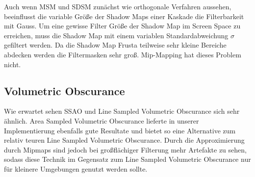 \documentclass[runningheaders,a4paper]{llncs}
\begin{document}
Auch wenn MSM und SDSM zunächst wie orthogonale Verfahren aussehen, beeinflusst die variable Größe der Shadow Maps einer Kaskade die Filterbarkeit mit Gauss.
Um eine gewisse Filter Größe der Shadow Map im Screen Space zu erreichen, muss die Shadow Map mit einem variablen Standardabweichung $\sigma$ gefiltert werden.
Da die Shadow Map Frusta teilweise sehr kleine Bereiche abdecken werden die Filtermasken sehr groß.
Mip-Mapping hat dieses Problem nicht.


\subsection{Volumetric Obscurance}
Wie erwartet sehen SSAO und Line Sampled Volumetric Obscurance sich sehr ähnlich. Area Sampled Volumetric
Obscurance lieferte in unserer Implementierung ebenfalls gute Resultate und bietet so eine Alternative 
zum relativ teuren Line Sampled Volumetric Obscurance. Durch die Approximierung durch Mipmaps sind jedoch bei
großflächiger Filterung mehr Artefakte zu sehen, sodass diese Technik im Gegensatz zum Line Sampled Volumetric
Obscurance nur für kleinere Umgebungen genutzt werden sollte.
\end{document}
